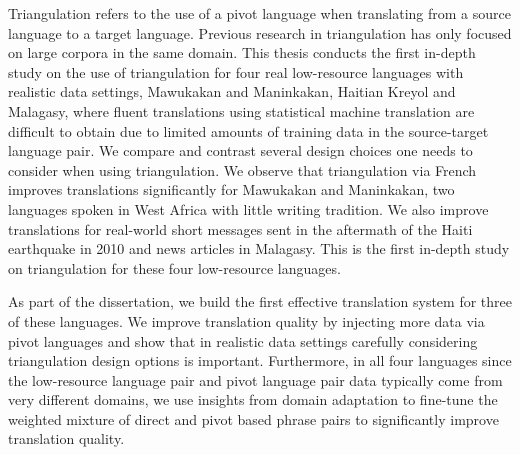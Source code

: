 
%
%


Triangulation refers to the use of a pivot language when translating from a source language to a target language. Previous research in triangulation has only focused on large corpora in the same domain.  This thesis conducts the first in-depth study on the use of triangulation for four real low-resource languages with realistic data settings, Mawukakan and Maninkakan, Haitian Kreyol and Malagasy, where fluent translations using statistical machine translation are difficult to obtain due to limited amounts of training data in the source-target language pair. We compare and contrast several design choices one needs to consider when using triangulation. We observe that triangulation via French improves translations significantly for Mawukakan and Maninkakan, two languages spoken in West Africa with little writing tradition. We also improve translations for real-world short messages sent in the aftermath of the Haiti earthquake in 2010 and news articles in Malagasy. This is the first in-depth study on triangulation for these four low-resource languages.

As part of the dissertation, we build the first effective translation system for three of these languages. We improve translation quality by injecting more data via pivot languages and show that in realistic data settings carefully considering triangulation design options is important. Furthermore, in all four languages since the low-resource language pair and pivot language pair data typically come from very different domains, we use insights from domain adaptation to fine-tune the weighted mixture of direct and pivot based phrase pairs to significantly improve translation quality. 





